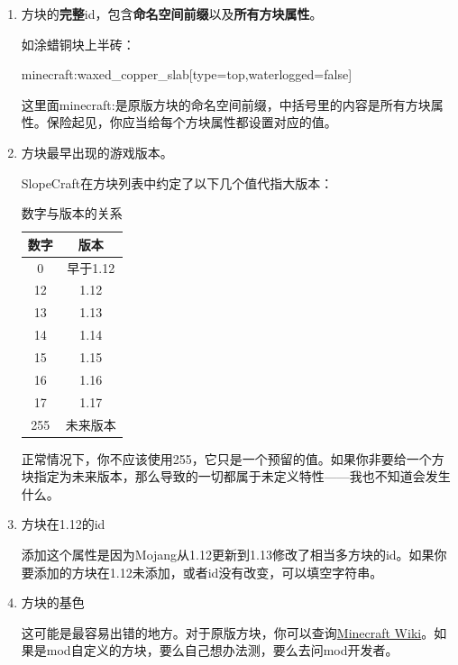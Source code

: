 \documentclass[UTF8]{ctexart}
\begin{document}
   \begin{enumerate}
       \item 方块的\textbf{完整}id，包含\textbf{命名空间前缀}以及\textbf{所有方块属性}。
       
       如涂蜡铜块上半砖：
       
       minecraft:waxed\_copper\_slab[type=top,waterlogged=false]

       这里面minecraft:是原版方块的命名空间前缀，中括号里的内容是所有方块属性。保险起见，你应当给每个方块属性都设置对应的值。
       \item 方块最早出现的游戏版本。
       
       SlopeCraft在方块列表中约定了以下几个值代指大版本：
       \begin{table}[h]
        \centering
        \caption{数字与版本的关系}
        \label{VerAndRealVer}
        \begin{tabular}{cc}\hline
            数字 & 版本 \\ \hline
            0 & 早于1.12 \\
            12 & 1.12 \\
            13 & 1.13 \\
            14 & 1.14 \\
            15 & 1.15 \\
            16 & 1.16 \\
            17 & 1.17 \\
            255 & 未来版本 \\
            \hline            
        \end{tabular}
       \end{table}

   正常情况下，你不应该使用255，它只是一个预留的值。如果你非要给一个方块指定为未来版本，那么导致的一切都属于未定义特性——我也不知道会发生什么。

   \item 方块在1.12的id
   
   添加这个属性是因为Mojang从1.12更新到1.13修改了相当多方块的id。如果你要添加的方块在1.12未添加，或者id没有改变，可以填空字符串。
   \item 方块的基色
   
   这可能是最容易出错的地方。对于原版方块，你可以查询\href{https://wiki.biligame.com/mc/%E5%9C%B0%E5%9B%BE%E7%89%A9%E5%93%81%E6%A0%BC%E5%BC%8F#idcounts.dat_.E6.A0.BC.E5.BC.8F}{Minecraft Wiki}。如果是mod自定义的方块，要么自己想办法测，要么去问mod开发者。
   

\end{enumerate}
\end{document}
